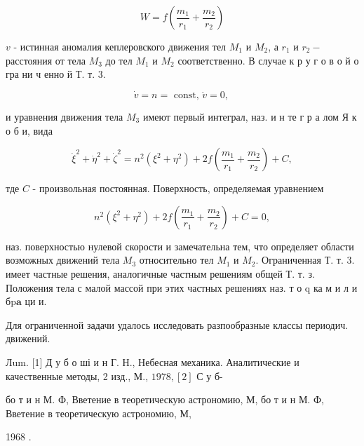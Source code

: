 \documentclass[10pt]{article}
\begin{document}
\[

W=f\left(\frac{m_{1}}{r_{1}}+\frac{m_{2}}{r_{2}}\right)

\]



$v$ - истинная аномалия кеплеровского движения тел $M_{1}$ и $M_{2}$, а $r_{1}$ и $r_{2}-$ расстояния от тела $M_{3}$ до тел $M_{1}$ и $M_{2}$ соответственно. В случае к р у г о в о й о гра ни ч енно й Т. т. 3.



\[

\dot{v}=n=\text { const, } \ddot{v}=0 \text {, }

\]



и уравнения движения тела $M_{3}$ имеют первый интеграл, наз. и н те г р а лом Я к о б и, вида



\[

\dot{\xi}^{2}+\dot{\eta}^{2}+\dot{\zeta}^{2}=n^{2}\left(\xi^{2}+\eta^{2}\right)+2 f\left(\frac{m_{1}}{r_{1}}+\frac{m_{2}}{r_{2}}\right)+C,

\]



тде $C$ - произвольная постоянная. Поверхность, определяемая уравнением



\[

n^{2}\left(\xi^{2}+\eta^{2}\right)+2 f\left(\frac{m_{1}}{r_{1}}+\frac{m_{2}}{r_{2}}\right)+C=0,

\]



наз. поверхностью нулевой скорости и замечательна тем, что определяет области возможных движений тела $M_{3}$ относительно тел $M_{1}$ и $M_{2}$. Ограниченная Т. т. 3. имеет частные решения, аналогичные частным решениям общей Т. т. з. Положения тела с малой массой при этих частных решениях наз. т о q ка м и л и б$\mathrm{p} \mathbf{a}$ ци и.



Для ограниченной задачи удалось исследовать разпообразные классы периодич. движений.



Лum. [1] Д у б о ші и н Г. Н., Небесная механика. Аналитические и качественные методы, 2 изд., М., $1978,[2]$ С у б-

бо т и н М. Ф, Вветение в теоретическую астрономию, М, бо т и н М. Ф, Вветение в теоретическую астрономию, М,

1968 .
\end{document}
